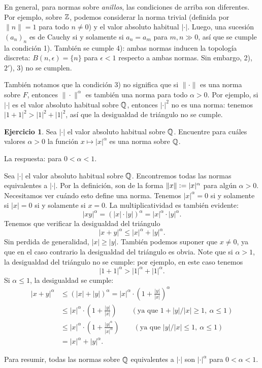 \documentclass{article}
\numberwithin{equation}{section}
\theoremstyle{definition}
\newtheorem{ejerc}{Ejercicio}
\begin{document}
En general, para normas sobre \emph{anillos}, las condiciones de arriba
son diferentes. Por ejemplo, sobre $\mathbb{Z}$, podemos considerar la norma trivial
(definida por $\|n\| = 1$ para todo $n\ne 0$) y el valor absoluto habitual
$|\cdot|$. Luego, una sucesión $(a_n)_n$ es de Cauchy si y solamente si
$a_n = a_m$ para $m,n \gg 0$, así que se cumple la condición 1).
También se cumple 4): ambas normas inducen la topología discreta:
$B (n,\epsilon) = \{ n \}$ para $\epsilon < 1$ respecto a ambas normas.
Sin embargo, 2), $2'$), 3) no se cumplen.

También notamos que la condición 3) no significa que si $\|\cdot\|$ es una norma
sobre $F$, entonces $\|\cdot\|^\alpha$ es también una norma para todo
$\alpha > 0$. Por ejemplo, si $|\cdot|$ es el valor absoluto habitual sobre
$\mathbb{Q}$, entonces $|\cdot|^2$ no es una norma: tenemos $|1+1|^2 > |1|^2 + |1|^2$,
así que la desigualdad de triángulo no se cumple.

\begin{ejerc}
  Sea $|\cdot|$ el valor absoluto habitual sobre $\mathbb{Q}$. Encuentre para cuáles
  valores $\alpha > 0$ la función $x\mapsto |x|^\alpha$ es una norma sobre
  $\mathbb{Q}$.

  \ifdefined\solutions\begin{solucion}
    La respuesta: para $0 < \alpha < 1$.

    Sea $|\cdot|$ el valor absoluto habitual sobre $\mathbb{Q}$. Encontremos todas
    las normas equivalentes a $|\cdot|$. Por la definición, son de la forma
    $\|x\| \mathrel{\mathop:}= |x|^\alpha$ para algún $\alpha > 0$. Necesitamos ver cuándo esto
    define una norma. Tenemos $|x|^\alpha = 0$ si y solamente si $|x| = 0$
    si y solamente si $x = 0$. La multiplicatividad es también evidente:
    $$|xy|^\alpha = (|x|\cdot |y|)^\alpha = |x|^\alpha\cdot |y|^\alpha.$$
    Tenemos que verificar la desigualdad del triángulo
    $$|x+y|^\alpha \le |x|^\alpha + |y|^\alpha.$$
    Sin perdida de generalidad, $|x| \ge |y|$. También podemos suponer
    que $x \ne 0$, ya que en el caso contrario la desigualdad del triángulo
    es obvia. Note que si $\alpha > 1$, la desigualdad del triángulo
    no se cumple: por ejemplo, en este caso tenemos
    $$|1+1|^\alpha > |1|^\alpha + |1|^\alpha.$$
    Si $\alpha \le 1$, la desigualdad se cumple:
    \begin{align*}
      |x+y|^\alpha & \le (|x|+|y|)^\alpha =
                     |x|^\alpha \cdot \left(1 + \frac{|y|}{|x|}\right)^\alpha \\
                   & \le |x|^\alpha \cdot \left(1 + \frac{|y|}{|x|}\right)
                     \quad\quad (\text{ya que }1 + |y|/|x| \ge 1, ~ \alpha \le 1)\\
                   & \le |x|^\alpha \cdot \left(1 +
                     \frac{|y|^\alpha}{|x|^\alpha}\right)
                     \quad\quad (\text{ya que }|y|/|x| \le 1, ~ \alpha \le 1)\\
                   & = |x|^\alpha + |y|^\alpha.
    \end{align*}

    Para resumir, todas las normas sobre $\mathbb{Q}$ equivalentes a $|\cdot|$ son
    $|\cdot|^\alpha$ para $0 < \alpha < 1$.
  \end{solucion}\fi
\end{ejerc}
\end{document}
